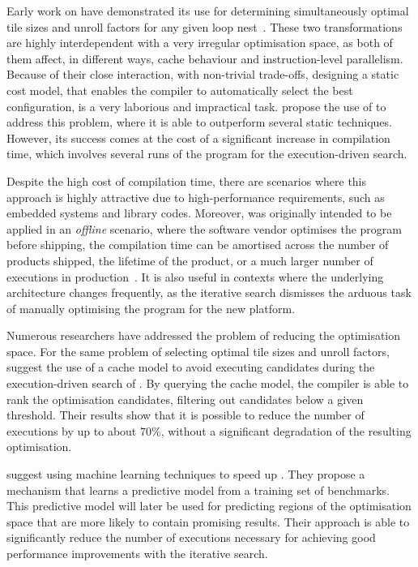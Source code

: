 Early work on {\itercomp} have demonstrated its use for determining simultaneously optimal tile sizes and unroll factors for any given loop nest~\cite{kisuki00,knijnenburg04}.
These two transformations are highly interdependent with a very irregular optimisation space, as both of them affect, in different ways, cache behaviour and instruction-level parallelism.
Because of their close interaction, with non-trivial trade-offs, designing a static cost model, that enables the compiler to automatically select the best configuration, is a very laborious and impractical task.
\cite{kisuki00} propose the use of {\itercomp} to address this problem, where it is able to outperform several static techniques.
However, its success comes at the cost of a significant increase in compilation time, which involves several runs of the program for the execution-driven search.

Despite the high cost of compilation time, there are scenarios where this approach is highly attractive due to high-performance requirements, such as embedded systems and library codes.
Moreover, {\itercomp} was originally intended to be applied in an \textit{offline} scenario, where the software vendor optimises the program before shipping, the compilation time can be amortised across the number of products shipped, the lifetime of the product, or a much larger number of executions in production~\cite{kisuki99,kisuki00,chen10}.
It is also useful in contexts where the underlying architecture changes frequently, as the iterative search dismisses the arduous task of manually optimising the program for the new platform.

Numerous researchers have addressed the problem of reducing the optimisation space.
For the same problem of selecting optimal tile sizes and unroll factors, \cite{knijnenburg04} suggest the use of a cache model to avoid executing candidates during the execution-driven search of {\itercomp}.
By querying the cache model, the compiler is able to rank the optimisation candidates, filtering out candidates below a given threshold.
Their results show that it is possible to reduce the number of executions by up to about 70\%, without a significant degradation of the resulting optimisation.

\cite{agakov06} suggest using machine learning techniques to speed up {\itercomp}.
They propose a mechanism that learns a predictive model from a training set of benchmarks.
This predictive model will later be used for predicting regions of the optimisation space that are more likely to contain promising results.
Their approach is able to significantly reduce the number of executions necessary for achieving good performance improvements with the iterative search.

